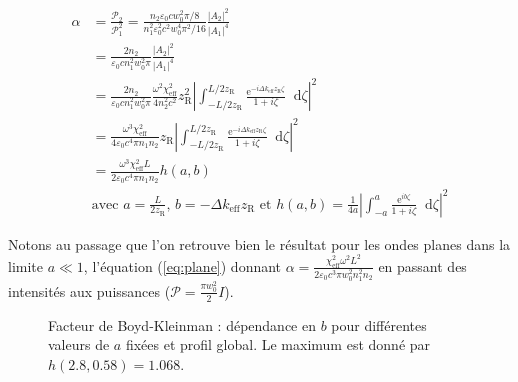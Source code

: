 \documentclass[11pt,a4paper]{article}
\newcommand{\diff}{\mathop{}\!\mathrm{d}}
\newcommand{\zr}{z_\mathsc{R}}
\newcommand{\chie}{\chi_\mathsc{eff}}
\renewcommand{\P}{\mathscr{P}}
\newcommand{\e}[1]{\text{e}^{#1}}
\newcommand{\mathsc}[1]{\mathrm{\scriptscriptstyle {#1}}}
\begin{document}
\begin{align} 
	\alpha &= \frac{\P_2}{\P_1^2} = \frac{n_2 \varepsilon_0 c w_0^2 \pi/8}{n_1^2 \varepsilon_0^2 c^2 w_0^4 \pi^2/16} \frac{|A_2|^2}{|A_1|^4} \nonumber \\
	&= \frac{2n_2}{\varepsilon_0 c n_1^2 w_0^2 \pi} \frac{|A_2|^2}{|A_1|^4} \nonumber  \\
	&= \frac{2n_2}{\varepsilon_0 c n_1^2 w_0^2 \pi} \frac{\omega^2\chi_\mathsc{eff}^2}{4 n_2^2 c^2} \zr^2 
	\left| \int_{-L/2\zr}^{L/2\zr} \frac{\e{-i\Delta k_\mathsc{eff} \zr \zeta}}{1+i\zeta} \diff \zeta \right|^2 \nonumber \\
	&= \frac{\omega^3 \chie^2}{4 \varepsilon_0 c^4 \pi n_1 n_2} \zr 
	\left| \int_{-L/2\zr}^{L/2\zr} \frac{\e{-i\Delta k_\mathsc{eff} \zr \zeta}}{1+i\zeta} \diff \zeta \right|^2 \nonumber \\
	&= \frac{\omega^3 \chie^2 L}{2 \varepsilon_0 c^4 \pi n_1 n_2} h(a,b) \\
	&\text{avec } \boxed{ a=\frac{L}{2z_{\mathsc R}}\text{, } b=- \Delta k_\mathsc{eff} z_{\mathsc R}
	\text{ et } h(a,b)=\frac{1}{4a} \left|\int_{-a}^{a} \frac{\e{ib\zeta}}{1+i\zeta} \diff \zeta \right|^2 } \nonumber 
\end{align}


Notons au passage que l'on retrouve bien le résultat pour les ondes planes dans la limite $a\ll1$, l'équation (\ref{eq:plane}) donnant $\alpha = \frac{\chie^2 \omega^2 L^2}{2 \varepsilon_0 c^3 \pi w_0^2 n_1^2 n_2}$ en passant des intensités aux puissances ($\P = \frac{\pi w_0^2}{2} I$). 


\begin{figure}[htpb] 
\centering
\hspace*{-1cm}
\begin{subfigure}[b]{0.48\textwidth}
	\small
	
\end{subfigure}
\hspace{0.2cm}
\begin{subfigure}[b]{0.48\textwidth}
	\small
	
\end{subfigure}
\vspace{-0.5cm}
\caption{Facteur de Boyd-Kleinman : \small dépendance en $b$ pour différentes valeurs de $a$ fixées et profil global. Le maximum est donné par $h(2.8,0.58)=1.068$.}
\label{fig:bk-factor}
\end{figure}
\end{document}
